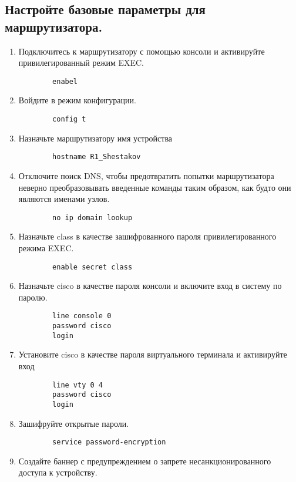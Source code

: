 \subsection{Настройте базовые параметры для маршрутизатора.}
\begin{enumerate}[a]
    \item Подключитесь к маршрутизатору с помощью консоли и активируйте привилегированный режим
    EXEC\@.
    \begin{verbatim}
        enabel
    \end{verbatim}
    \item Войдите в режим конфигурации.
    \begin{verbatim}
        config t
    \end{verbatim}
    \item Назначьте маршрутизатору имя устройства
    \begin{verbatim}
        hostname R1_Shestakov
    \end{verbatim}
    \item Отключите поиск DNS, чтобы предотвратить попытки маршрутизатора неверно преобразовывать
    введенные команды таким образом, как будто они являются именами узлов.
    \begin{verbatim}
        no ip domain lookup
    \end{verbatim}
    \item Назначьте class в качестве зашифрованного пароля привилегированного режима EXEC\@.
    \begin{verbatim}
        enable secret class
    \end{verbatim}
    \item Назначьте cisco в качестве пароля консоли и включите вход в систему по паролю.
    \begin{verbatim}
        line console 0
        password cisco
        login
    \end{verbatim}
    \item Установите cisco в качестве пароля виртуального терминала и активируйте вход
    \begin{verbatim}
        line vty 0 4
        password cisco
        login
    \end{verbatim}
    \item Зашифруйте открытые пароли.
    \begin{verbatim}
        service password-encryption
    \end{verbatim}
    \item Создайте баннер с предупреждением о запрете несанкционированного доступа к устройству.

\end{enumerate}
